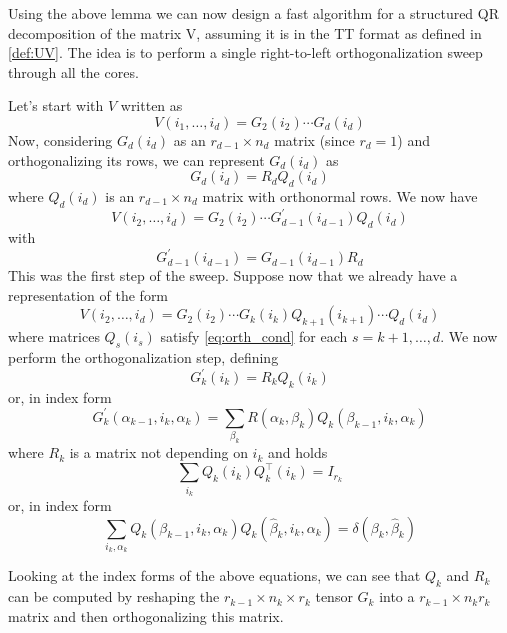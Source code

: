 Using the above lemma we can now design a fast algorithm for a structured QR decomposition of the matrix V, assuming it is in the TT format as defined in \ref{def:UV}. The idea is to perform a single right-to-left orthogonalization sweep through all the cores.

Let's start with $V$ written as
\begin{equation*}
  V(i_1,\ldots,i_d) = G_2(i_2) \cdots G_d(i_d)
\end{equation*}
Now, considering $G_d(i_d)$ as an $r_{d-1} \times n_d$ matrix (since $r_d = 1$) and orthogonalizing its rows, we can represent $G_d(i_d)$ as
\begin{equation*}
  G_d(i_d) = R_d Q_d(i_d)
\end{equation*}
where $Q_d(i_d)$ is an $r_{d-1} \times n_d$ matrix with orthonormal rows.
We now have
\begin{equation*}
  V(i_2,\ldots,i_d) = G_2(i_2) \cdots G^\prime_{d-1}(i_{d-1}) Q_d(i_d)
\end{equation*}
with
\begin{equation*}
  G^\prime_{d-1}(i_{d-1}) = G_{d-1}(i_{d-1}) R_d
\end{equation*}
This was the first step of the sweep. Suppose now that we already have a representation of the form
\begin{equation*}
  V(i_2,\ldots,i_d) = G_2(i_2) \cdots G_k(i_k) Q_{k+1}(i_{k+1}) \cdots Q_d(i_d)
\end{equation*}
where matrices $Q_s(i_s)$ satisfy \ref{eq:orth_cond} for each $s = k+1, \ldots, d$. We now perform the orthogonalization step, defining
\begin{equation*}
  G^\prime_k(i_k) = R_k Q_k(i_k)
\end{equation*}
or, in index form
\begin{equation*}
  G^\prime_k (\alpha_{k-1},i_k,\alpha_k) = \sum_{\beta_k} R(\alpha_k,\beta_k) Q_k(\beta_{k-1},i_k,\alpha_k)
\end{equation*}
where $R_k$ is a matrix not depending on $i_k$ and holds
\begin{equation*}
  \sum_{i_k} Q_k(i_k) Q_k^\top(i_k) = I_{r_k}
\end{equation*}
or, in index form
\begin{equation*}
  \sum_{i_k,\alpha_k} Q_k(\beta_{k-1},i_k,\alpha_k)Q_k(\hat{\beta}_k,i_k,\alpha_k) = \delta(\beta_k,\hat{\beta}_k)
\end{equation*}

Looking at the index forms of the above equations, we can see that $Q_k$ and $R_k$ can be computed by reshaping the $r_{k-1} \times n_k \times r_k$ tensor $G_k$ into a $r_{k-1} \times n_k r_k$ matrix and then orthogonalizing this matrix.


